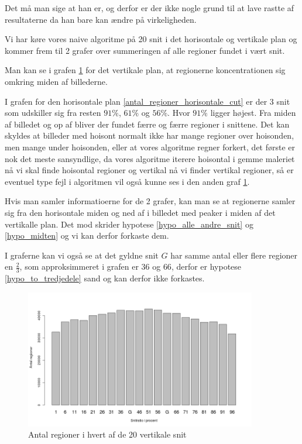 Det må man sige at han er, og derfor er der ikke nogle grund til at lave
rastte af resultaterne da han bare kan ændre på virkeligheden.

Vi har køre vores naive algoritme på 20 snit i det horisontale og
vertikale plan og kommer frem til 2 grafer over summeringen af alle
regioner fundet i vært snit. 

Man kan se i grafen \ref{antal_regioner_vertikale_cut} for det vertikale
plan, at regionerne koncentrationen sig omkring miden af billederne.

I grafen for den horisontale plan \ref{antal_regioner_horisontale_cut}
er der 3 snit som udskiller sig fra resten $91\%$, $61\%$ og $56\%$.
Hvor $91\%$ ligger højest. Fra miden af billedet og op af bliver der
fundet færre og færre regioner i snittene. Det kan skyldes at billeder med
hoisont normalt ikke har mange regioner over hoisonden, men mange under
hoisonden, eller at vores algoritme regner forkert, det første er nok det meste
sansyndlige, da vores algoritme iterere hoisontal i gemme maleriet nå vi skal
finde hoisontal regioner og vertikal nå vi finder vertikal regioner, så er
eventuel type fejl i algoritmen vil også kunne ses i den anden graf
\ref{antal_regioner_vertikale_cut}.

Hvis man samler informatioerne for de 2 grafer, kan man se at regionerne
samler sig fra den horisontale miden og ned af i billedet med peaker i
miden af det vertikalle plan. Det mod skrider hypotese \ref{hypo_alle_andre_snit} og \ref{hypo_midten}
og vi kan derfor forkaste dem.

I graferne kan vi også se at det gyldne snit $G$ har samme antal eller
flere regioner en $\frac{2}{3}$, som approksimmeret i grafen er $36$ og
$66$, derfor er hypotese \ref{hypo_to_tredjedele} sand og kan derfor ikke forkastes.

\begin{figure}[h!]
	\begin{center}
		\includegraphics[width=0.9\textwidth]{afsnit/resultater/billeder/cut0cut1eatsperratio.png}
	\end{center}
	\caption{Antal regioner i hvert af de 20 vertikale snit}
	\label{antal_regioner_vertikale_cut}
\end{figure}

